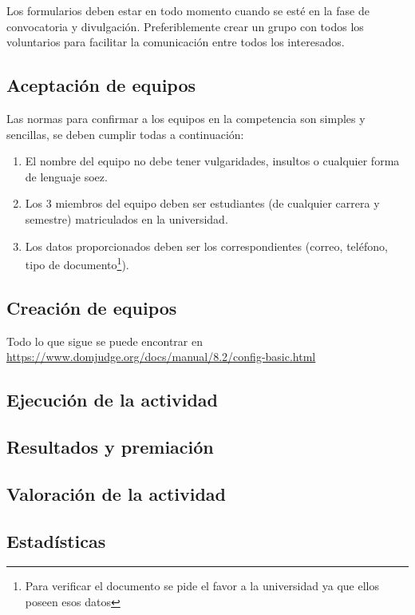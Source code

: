 \documentclass{article}
\begin{document}
Los formularios deben estar en todo momento cuando se esté en la fase de convocatoria y divulgación. Preferiblemente crear un grupo con todos los voluntarios para facilitar la comunicación entre todos los interesados.




\subsection{Aceptación de equipos}

Las normas para confirmar a los equipos en la competencia son simples y sencillas, se deben cumplir todas a continuación:

\begin{enumerate}
  \item El nombre del equipo no debe tener vulgaridades, insultos o cualquier forma de lenguaje soez.
  \item Los 3 miembros del equipo deben ser estudiantes (de cualquier carrera y semestre) matriculados en la universidad.
  \item Los datos proporcionados deben ser los correspondientes (correo, teléfono, tipo de documento\footnote{Para verificar el documento se pide el favor a la universidad ya que ellos poseen esos datos}).
\end{enumerate}


\subsection{Creación de equipos}

Todo lo que sigue se puede encontrar en \url{https://www.domjudge.org/docs/manual/8.2/config-basic.html}



\subsection{Ejecución de la actividad}

\subsection{Resultados y premiación}

\subsection{Valoración de la actividad}

\subsection{Estadísticas}
\end{document}
